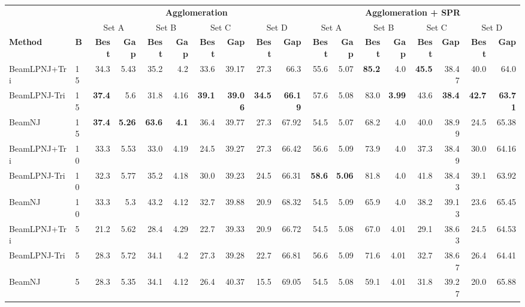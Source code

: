\begin{tabular}{llrrrrrrrr|rrrrrrrr}
\toprule
&& \multicolumn{8}{c}{\textbf{Agglomeration}} & \multicolumn{8}{c}{\textbf{Agglomeration + SPR}} \\
\cmidrule(lr){3-10} \cmidrule(lr){11-18}
&& \multicolumn{2}{c}{Set A} & \multicolumn{2}{c}{Set B}& \multicolumn{2}{c}{Set C}& \multicolumn{2}{c}{Set D} & \multicolumn{2}{c}{Set A} & \multicolumn{2}{c}{Set B}& \multicolumn{2}{c}{Set C}& \multicolumn{2}{c}{Set D} \\
\cmidrule(lr){3-4} \cmidrule(lr){5-6} \cmidrule(lr){7-8} \cmidrule(lr){9-10} \cmidrule(lr){11-12} \cmidrule(lr){13-14} \cmidrule(lr){15-16} \cmidrule(lr){17-18}
\textbf{Method} & \textbf{B} & \textbf{Best} & \textbf{Gap} & \textbf{Best} & \textbf{Gap} & \textbf{Best} & \textbf{Gap} & \textbf{Best} & \textbf{Gap} & \textbf{Best} & \textbf{Gap} & \textbf{Best} & \textbf{Gap} & \textbf{Best} & \textbf{Gap} & \textbf{Best} & \textbf{Gap} \\
\midrule
BeamLPNJ+Tri & 15 & 34.3 & 5.43 & 35.2 & 4.2 & 33.6 & 39.17 & 27.3 & 66.3 & 55.6 & 5.07 & \textbf{85.2} & 4.0 & \textbf{45.5} & 38.47 & 40.0 & 64.0 \\
BeamLPNJ-Tri & 15 & \textbf{37.4} & 5.6 & 31.8 & 4.16 & \textbf{39.1} & \textbf{39.06} & \textbf{34.5} & \textbf{66.19} & 57.6 & 5.08 & 83.0 & \textbf{3.99} & 43.6 & \textbf{38.4} & \textbf{42.7} & \textbf{63.71} \\
BeamNJ & 15 & \textbf{37.4} & \textbf{5.26} & \textbf{63.6} & \textbf{4.1} & 36.4 & 39.77 & 27.3 & 67.92 & 54.5 & 5.07 & 68.2 & 4.0 & 40.0 & 38.99 & 24.5 & 65.38 \\
BeamLPNJ+Tri & 10 & 33.3 & 5.53 & 33.0 & 4.19 & 24.5 & 39.27 & 27.3 & 66.42 & 56.6 & 5.09 & 73.9 & 4.0 & 37.3 & 38.49 & 30.0 & 64.16 \\
BeamLPNJ-Tri & 10 & 32.3 & 5.77 & 35.2 & 4.18 & 30.0 & 39.23 & 24.5 & 66.31 & \textbf{58.6} & \textbf{5.06} & 81.8 & 4.0 & 41.8 & 38.43 & 39.1 & 63.92 \\
BeamNJ & 10 & 33.3 & 5.3 & 43.2 & 4.12 & 32.7 & 39.88 & 20.9 & 68.32 & 54.5 & 5.09 & 65.9 & 4.0 & 38.2 & 39.13 & 23.6 & 65.45 \\
BeamLPNJ+Tri & 5 & 21.2 & 5.62 & 28.4 & 4.29 & 22.7 & 39.33 & 20.9 & 66.72 & 54.5 & 5.08 & 67.0 & 4.01 & 29.1 & 38.63 & 24.5 & 64.53 \\
BeamLPNJ-Tri & 5 & 28.3 & 5.72 & 34.1 & 4.2 & 27.3 & 39.28 & 22.7 & 66.81 & 56.6 & 5.09 & 71.6 & 4.01 & 32.7 & 38.67 & 26.4 & 64.41 \\
BeamNJ & 5 & 28.3 & 5.35 & 34.1 & 4.12 & 26.4 & 40.37 & 15.5 & 69.05 & 54.5 & 5.08 & 59.1 & 4.01 & 31.8 & 39.27 & 20.0 & 65.88 \\

\end{tabular}
